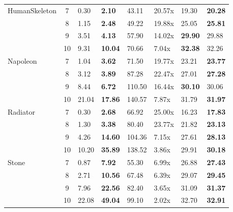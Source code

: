\begin{table}[htbp]
\begin{tabular}{lcp{1cm}p{2cm}p{2cm}lp{2cm}p{2cm}}
    \midrule
    HumanSkeleton & 7 & 0.30 & \textbf{2.10} & 43.11 & 20.57x & 19.30 & \textbf{20.28} \\
     & 8 & 1.15 & \textbf{2.48} & 49.22 & 19.88x & 25.05 & \textbf{25.81} \\
     & 9 & 3.51 & \textbf{4.13} & 57.90 & 14.02x & \textbf{29.90} & 29.88 \\
     & 10 & 9.31 & \textbf{10.04} & 70.66 & 7.04x & \textbf{32.38} & 32.26 \\
    \midrule
    Napoleon & 7 & 1.04 & \textbf{3.62} & 71.50 & 19.77x & 23.21 & \textbf{23.77} \\
     & 8 & 3.12 & \textbf{3.89} & 87.28 & 22.47x & 27.01 & \textbf{27.28} \\
     & 9 & 8.44 & \textbf{6.72} & 110.50 & 16.44x & \textbf{30.10} & 30.06 \\
     & 10 & 21.04 & \textbf{17.86} & 140.57 & 7.87x & 31.79 & \textbf{31.97} \\
    \midrule
    Radiator & 7 & 0.30 & \textbf{2.68} & 66.92 & 25.00x & 16.23 & \textbf{17.83} \\
     & 8 & 1.30 & \textbf{3.38} & 80.40 & 23.77x & 21.82 & \textbf{23.13} \\
     & 9 & 4.26 & \textbf{14.60} & 104.36 & 7.15x & 27.61 & \textbf{28.13} \\
     & 10 & 10.20 & \textbf{35.89} & 138.52 & 3.86x & 29.91 & \textbf{30.18} \\
    \midrule
    Stone & 7 & 0.87 & \textbf{7.92} & 55.30 & 6.99x & 26.88 & \textbf{27.43} \\
     & 8 & 2.71 & \textbf{10.56} & 67.48 & 6.39x & 29.07 & \textbf{29.45} \\
     & 9 & 7.96 & \textbf{22.56} & 82.40 & 3.65x & 31.09 & \textbf{31.37} \\
     & 10 & 22.08 & \textbf{49.04} & 99.10 & 2.02x & 32.70 & \textbf{32.91} \\
    \bottomrule
  \end{tabular}
\end{table}
